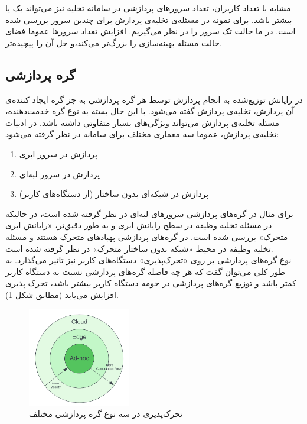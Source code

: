 مشابه با تعداد کاربران، تعداد سرورهای پردازشی در سامانه تخلیه نیز می‌تواند یک یا بیشتر باشد. برای نمونه در \cite{multiuser} مسئله‌ی تخلیه‌ی پردازش برای چندین سرور بررسی شده است. در \CurrentProject ما حالت تک سرور را در نظر می‌گیریم. افزایش تعداد سرورها عموما فضای حالت مسئله بهینه‌سازی را بزرگ‌تر می‌کند،‌و حل آن را پیچیده‌تر.

\subsection{گره پردازشی}
در رایانش توزیع‌شده به انجام پردازش توسط هر گره پردازشی به جز گره ایجاد کننده‌ی آن پردازش، تخلیه‌ی پردازش گفته می‌شود. با این حال بسته به نوع گره خدمت‌دهنده، مسئله تخلیه‌ی پردازش می‌تواند ویژگی‌های بسیار متفاوتی داشته باشد. در ادبیات تخلیه‌ی پردازش، عموما سه معماری مختلف برای سامانه در نظر گرفته می‌شود:
\begin{enumerate}
	\item پردازش در سرور ابری
	\item پردازش در سرور لبه‌ای
	\item پردازش در شبکه‌ای بدون ساختار (از دستگاه‌های کاربر)
\end{enumerate}
برای مثال در \cite{Liu} گره‌های پردازشی سرورهای لبه‌ای در نظر گرفته شده است، در حالیکه در \cite{kwak} مسئله تخلیه وظیفه در سطح رایانش ابری و به طور دقیق‌تر، «رایانش ابری متحرک» بررسی شده است. در \cite{manet} گره‌های پردازشی پهبادهای متحرک هستند و مسئله تخلیه وظیفه در محیط «شبکه بدون ساختار متحرک» در نظر گرفته شده است. \\

نوع گره‌های پردازشی بر روی «تحرک‌پذیری» دستگاه‌های کاربر نیز تاثیر می‌گذارد. به طور کلی می‌توان گفت که هر چه فاصله گره‌های پردازشی نسبت به دستگاه کاربر کمتر باشد و توزیع گره‌های پردازشی در حومه دستگاه کاربر بیشتر باشد، تحرک پذیری افزایش می‌یابد (مطابق شکل \ref{fig:mobility}).
\begin{figure}[H]
	\centering
	\includegraphics[width=0.4\textwidth]{figures/mobility.png}
	\caption{تحرک‌پذیری در سه نوع گره پردازشی مختلف}
	\label{fig:mobility}
\end{figure}

